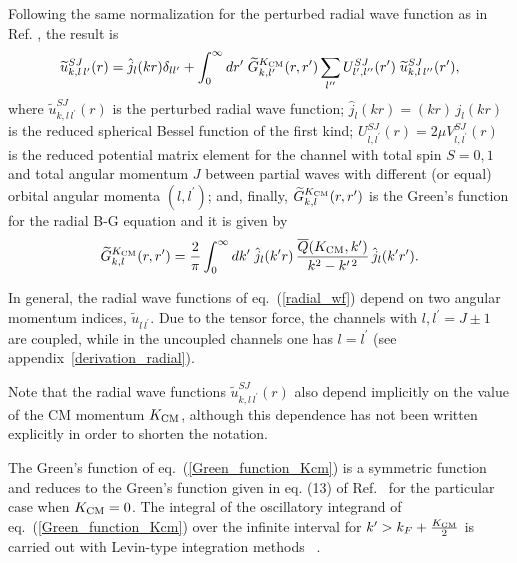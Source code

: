 \documentclass[aps,twocolumn,showpacs,preprintnumbers,amsmath,amssymb,nofootinbib,superscriptaddress,showkeys,noeprint]{revtex4-1}
\begin{document}
Following the same normalization for the perturbed radial wave
function as in Ref.  \cite{RuizSimo:2017tcb}, the result is
\begin{equation}\label{radial_wf}
\widetilde{u}^{SJ}_{k,l\,l^\prime}(r)=
\hat{j}_l(kr)\delta_{ll^\prime}+ \int^{\infty}_0 
dr^\prime \; 
\widetilde{G}^{K_{\rm CM}}_{k,l^\prime}(r,r^\prime)
\sum_{l^{\prime\prime}} U^{SJ}_{l^\prime,l^{\prime\prime}}(r^\prime)\;
\widetilde{u}^{SJ}_{k,l\,l^{\prime\prime}}(r^\prime),
\end{equation}
where $\widetilde{u}^{SJ}_{k,l\,l^\prime}(r)$ is the perturbed radial
wave function; $\hat{j}_l(kr)=(kr)\,j_l(kr)$ is the reduced spherical
Bessel function of the first kind; $U^{SJ}_{l,l^\prime}(r)=2\mu
V^{SJ}_{l,l^\prime}(r)$ is the reduced potential matrix element for
the channel with total spin $S=0,1$ and total angular momentum $J$
between partial waves with different (or equal) orbital angular
momenta $(l,l^\prime)$; and, finally, $\widetilde{G}^{K_{\rm
    CM}}_{k,l}(r,r^\prime)$ is the Green's function for the radial B-G
equation and it is given by
\begin{equation}\label{Green_function_Kcm}
\widetilde{G}^{K_{\rm CM}}_{k,l}(r,r^\prime)=
\frac{2}{\pi} \int^{\infty}_0 dk^\prime\; \hat{j}_l(k^\prime r)\,
\frac{\overline{Q}(K_{\rm CM},k^\prime)}{k^2-k^{\prime\,2}}\,
\hat{j}_l(k^\prime r^\prime).
\end{equation}

In general, the radial wave functions of eq.~(\ref{radial_wf}) depend
on two angular momentum indices, $\widetilde{u}_{l\,l^\prime}$.  Due
to the tensor force, the channels with $l,l^\prime=J\pm 1$ are
coupled, while in the uncoupled channels one has $l=l^\prime$ (see
appendix~\ref{derivation_radial}).


Note that the radial wave functions
$\widetilde{u}^{SJ}_{k,l\,l^\prime}(r)$ also depend implicitly on the
value of the CM momentum $K_{\rm CM}$, although this dependence has
not been written explicitly in order to shorten the notation.


The Green's function of eq.~(\ref{Green_function_Kcm}) is a symmetric
function and reduces to the Green's function given in eq. (13) of
Ref.~\cite{RuizSimo:2017tcb} for the particular case when $K_{\rm
  CM}=0$. The integral of the oscillatory integrand of
eq.~(\ref{Green_function_Kcm}) over the infinite interval for
$k^\prime > k_F + \frac{K_{\rm CM}}{2}$ is carried out with Levin-type
integration methods ~\cite{Levin1994,Levin1996}.
\end{document}
